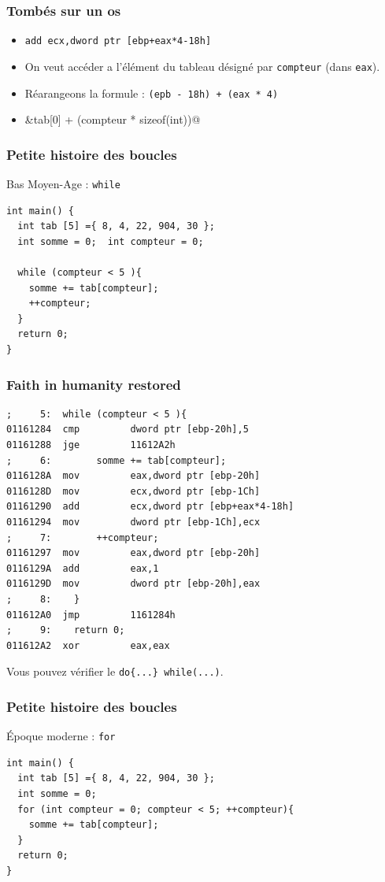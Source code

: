 \documentclass{beamer}
\begin{document}
\begin{frame}[fragile]
\frametitle{Tombés sur un os}
\begin{itemize}
\item  \lstinline[language={[x86masm]Assembler}]@add ecx,dword ptr [ebp+eax*4-18h]@
\item On veut accéder a l'élément du tableau désigné par \texttt{compteur} (dans \texttt{eax}).
\item Réarangeons la formule : \texttt{(epb - 18h) + (eax * 4)}
\item \lstinline@ &tab[0] + (compteur * sizeof(int))@
\end{itemize}
\end{frame}

\begin{frame}[fragile]
\frametitle{Petite histoire des boucles}
Bas Moyen-Age : \lstinline+while+
\begin{lstlisting}
int main() {
  int tab [5] ={ 8, 4, 22, 904, 30 };
  int somme = 0;  int compteur = 0;
  
  while (compteur < 5 ){
    somme += tab[compteur];
    ++compteur;
  }
  return 0;
}
\end{lstlisting}
\end{frame}

\begin{frame}[fragile]
\frametitle{Faith in humanity restored}
\begin{lstlisting}[language={[x86masm]Assembler}, basicstyle={\scriptsize\ttfamily}]
;     5:  while (compteur < 5 ){
01161284  cmp         dword ptr [ebp-20h],5  
01161288  jge         11612A2h  
;     6: 		somme += tab[compteur];
0116128A  mov         eax,dword ptr [ebp-20h]  
0116128D  mov         ecx,dword ptr [ebp-1Ch]  
01161290  add         ecx,dword ptr [ebp+eax*4-18h]  
01161294  mov         dword ptr [ebp-1Ch],ecx  
;     7: 		++compteur;
01161297  mov         eax,dword ptr [ebp-20h]  
0116129A  add         eax,1  
0116129D  mov         dword ptr [ebp-20h],eax  
;     8: 	}
011612A0  jmp         1161284h  
;     9: 	return 0;
011612A2  xor         eax,eax  
\end{lstlisting}
Vous pouvez vérifier le \lstinline+do{...} while(...)+.
\end{frame}

\begin{frame}[fragile]
\frametitle{Petite histoire des boucles}
Époque moderne : \lstinline+for+
\begin{lstlisting}
int main() {
  int tab [5] ={ 8, 4, 22, 904, 30 };
  int somme = 0;  
  for (int compteur = 0; compteur < 5; ++compteur){
    somme += tab[compteur];
  }
  return 0;
}
\end{lstlisting}
\end{frame}
\end{document}
